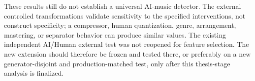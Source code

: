 These results still do not establish a universal AI-music detector.  The
external controlled transformations validate sensitivity to the specified
interventions, not construct specificity; a compressor, human quantization,
genre, arrangement, mastering, or separator behavior can produce similar
values.  The existing independent AI/Human external test was not reopened for
feature selection.  The new extension should therefore be frozen and tested
there, or preferably on a new generator-disjoint and production-matched test,
only after this thesis-stage analysis is finalized.
